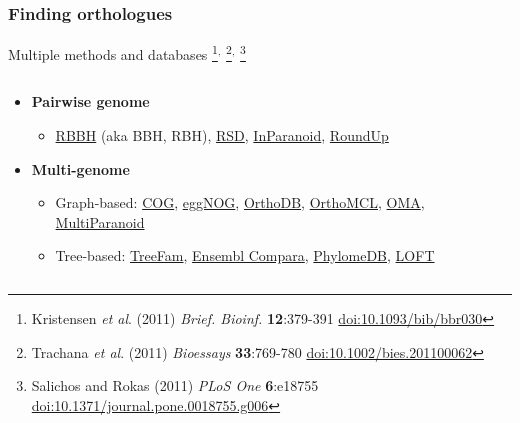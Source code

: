 \begin{frame}
  \frametitle{Finding orthologues}
      Multiple methods and databases%
\footnote{\tiny{Kristensen \textit{et al}. (2011) \textit{Brief. Bioinf.} \textbf{12}:379-391 \href{http://dx.doi.org/10.1093/bib/bbr030}{doi:10.1093/bib/bbr030}}}$^,$%
\footnote{\tiny{Trachana \textit{et al}. (2011) \textit{Bioessays} \textbf{33}:769-780 \href{http://dx.doi.org/10.1002/bies.201100062}{doi:10.1002/bies.201100062}}}$^,$%
\footnote{\tiny{Salichos and Rokas (2011) \textit{PLoS One} \textbf{6}:e18755 \href{http://dx.doi.org/10.1371/journal.pone.0018755.g006}{doi:10.1371/journal.pone.0018755.g006}}}
  \begin{columns}[T]    \begin{column}{6cm}
      \begin{itemize}
        \item \textbf{Pairwise genome}
        \begin{itemize}
          \item \href{http://armchairbiology.blogspot.co.uk/2012/07/on-reciprocal-best-blast-hits.html}{RBBH} (aka BBH, RBH), \href{http://link.springer.com/protocol/10.1007/978-1-59745-515-2_7}{RSD}, \href{http://inparanoid.sbc.su.se/cgi-bin/index.cgi}{InParanoid}, \href{http://roundup.hms.harvard.edu/}{RoundUp}
        \end{itemize}
        \item \textbf{Multi-genome}
        \begin{itemize}
          \item Graph-based: \href{http://www.ncbi.nlm.nih.gov/COG/}{COG}, \href{http://eggnog.embl.de/}{eggNOG}, \href{http://cegg.unige.ch/orthodb7}{OrthoDB}, \href{http://orthomcl.org/orthomcl/}{OrthoMCL}, \href{http://omabrowser.org/cgi-bin/gateway.pl}{OMA}, \href{http://multiparanoid.sbc.su.se/}{MultiParanoid}
          \item Tree-based: \href{http://www.treefam.org/}{TreeFam}, \href{http://www.ensembl.org/info/genome/compara/index.html}{Ensembl Compara}, \href{http://phylomedb.org/}{PhylomeDB}, \href{https://trac.nbic.nl/loft/}{LOFT}
        \end{itemize}
      \end{itemize}
    \end{column}
    \begin{column}{4cm}

\end{column}
\end{columns}
\end{frame}
